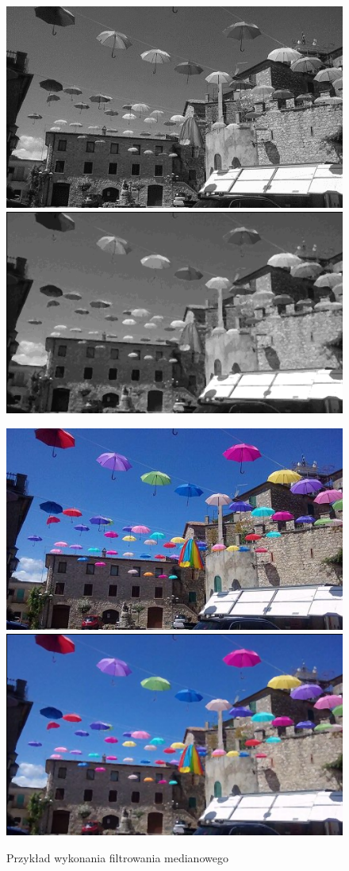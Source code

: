 \documentclass{article}
\begin{document}
	\begin{figure}[!ht]	
	\centering	
	\includegraphics[scale=1.2]{img/gray-obraz1}
	\includegraphics[scale=1.2]{img/filtrowanie/gray-medianowe}
	
	\includegraphics[scale=1.2]{img/rgb-obraz1}
	\includegraphics[scale=1.2]{img/filtrowanie/rgb-medianowe}
	\caption{Przykład wykonania filtrowania medianowego}
	\label{fig25}	
	\end{figure}	
	
 
\end{document}
